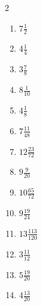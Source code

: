 \documentclass[12pt]{article}
\begin{document}
\begin{multicols}{2}
\begin{enumerate}
\item $ 7 \frac{1}{2} $
\item $ 4 \frac{1}{4} $
\item $ 3 \frac{7}{8} $
\item $ 8 \frac{1}{10} $
\item $ 4 \frac{1}{8} $
\item $ 7 \frac{11}{48} $
\item $ 12 \frac{23}{72} $
\item $ 9 \frac{9}{20} $
\item $ 10 \frac{65}{72} $
\item $ 9 \frac{19}{24} $
\item $ 13 \frac{113}{120} $
\item $ 3 \frac{11}{12} $
\item $ 5 \frac{19}{20} $
\item $ 4 \frac{13}{20} $
\end{enumerate}\end{multicols}\newpage
\end{document}
